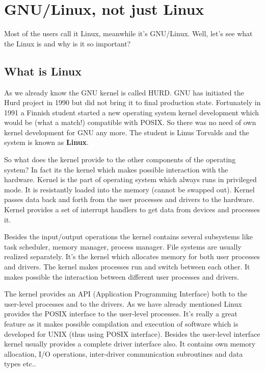 

\section{GNU/Linux, not just Linux}
\label{gnu_linux}
Most of the users call it Linux, meanwhile it's GNU/Linux. Well, let's see what the Linux is and why is it so important?

\subsection{What is Linux}

As we already know the GNU kernel is called HURD. GNU has initiated the Hurd project in 1990 but did not bring it to final production state. Fortunately in 1991 a Finnish student started a new operating system kernel development which would be (what a match!) compatible with POSIX. So there was no need of own kernel development for GNU any more. The student is Linus Torvalds and the system is known as \textbf {Linux}. 

So what does the kernel provide to the other components of the operating system? In fact its the kernel which makes possible interaction with the hardware. Kernel is the part of operating system which always runs in privileged mode. It is resistantly loaded into the memory (cannot be swapped out). Kernel passes data back and forth from the user processes and drivers to the hardware. Kernel provides a set of interrupt handlers to get data from devices and processes it. 

Besides the input/output operations the kernel contains several subsystems like task scheduler, memory manager, process manager. File systems are usually realized separately. It's the kernel which allocates memory for both user processes and drivers. The kernel makes processes run and switch between each other. It makes possible the interaction between different user processes and drivers.

The kernel provides an API (Application Programming Interface) both to the user-level processes and to the drivers. As we have already mentioned Linux provides the POSIX interface to the user-level processes. It's really a great feature as it makes possible compilation and execution of software which is developed for UNIX (thus using POSIX interface). Besides the user-level interface kernel usually provides a complete driver interface also. It contains own memory allocation, I/O operations, inter-driver communication subroutines and data types etc..

